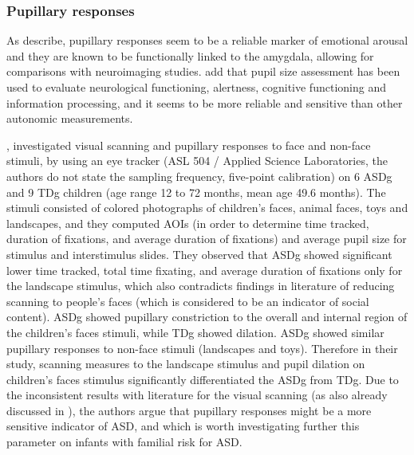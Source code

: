 \subsubsection{Pupillary responses}
\label{sec:pupillaryresponses}

As \cite{nuske2014pupil} describe, pupillary responses seem to be a reliable marker of emotional arousal and they are known to be functionally linked to the amygdala, allowing for comparisons with neuroimaging studies. \cite{martineau2011pupil} add that pupil size assessment has been used to evaluate neurological functioning, alertness, cognitive functioning and information processing, and it seems to be more reliable and sensitive than other autonomic measurements.

\cite{anderson2006visualscanning}, investigated visual scanning and pupillary responses to face and non-face stimuli, by using an eye tracker (ASL 504 / Applied Science Laboratories, the authors do not state the sampling frequency, five-point calibration) on 6 ASDg and 9 TDg children (age range 12 to 72 months, mean age 49.6 months). The stimuli consisted of colored photographs of children’s faces, animal faces, toys and landscapes, and they computed AOIs (in order to determine time tracked, duration of fixations, and average duration of fixations) and average pupil size for stimulus and interstimulus slides. They observed that ASDg showed significant lower time tracked, total time fixating, and average duration of fixations only for the landscape stimulus, which also contradicts findings in literature of reducing scanning to people’s faces (which is considered to be an indicator of social content). ASDg showed pupillary constriction to the overall and internal region of the children’s faces stimuli, while TDg showed dilation. ASDg showed similar pupillary responses to non-face stimuli (landscapes and toys). Therefore in their study, scanning measures to the landscape stimulus and pupil dilation on children’s faces stimulus significantly differentiated the ASDg from TDg. Due to the inconsistent results with literature for the visual scanning (as also already discussed in ), the authors argue that pupillary responses might be a more sensitive indicator of ASD, and which is worth investigating further this parameter on infants with familial risk for ASD.

